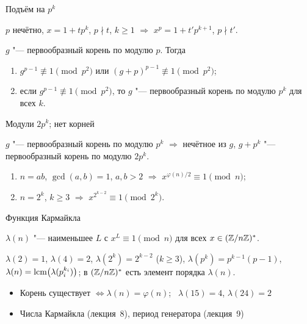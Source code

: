 \documentclass{ca-slides}
\begin{document}
\begin{canvasframe}{Подъём на $p^k$}
  \small
  \begin{lemma}
    $p$ нечётно, $x = 1 + tp^k$, $p \nmid t$, $k \ge 1$ $\Rightarrow$ $x^p = 1 + t'p^{k+1}$,
    $p \nmid t'$.
  \end{lemma}
  \begin{theorem}
    $g$ "--- первообразный корень по модулю $p$. Тогда
    \begin{enumerate}
      \item $g^{p-1} \not\equiv 1 \pmod{p^2}$ или $(g + p)^{p-1} \not\equiv 1 \pmod{p^2}$;
      \item если $g^{p-1} \not\equiv 1 \pmod{p^2}$, то $g$ "--- первообразный корень по
        модулю $p^k$ для всех $k$.
    \end{enumerate}
  \end{theorem}
\end{canvasframe}

\begin{canvasframe}{Модули $2p^k$; нет корней}
  \small
  \begin{proposition}
    $g$ "--- первообразный корень по модулю $p^k$ $\Rightarrow$ нечётное из $g$, $g + p^k$ "---
    первообразный корень по модулю $2p^k$.
  \end{proposition}
  \begin{lemma}
    \begin{enumerate}
      \item $n = ab$, $\gcd(a, b) = 1$, $a, b > 2$ $\Rightarrow$ $x^{\varphi(n)/2} \equiv 1 \pmod n$;
      \item $n = 2^k$, $k \ge 3$ $\Rightarrow$ $x^{2^{k-2}} \equiv 1 \pmod{2^k}$.
    \end{enumerate}
  \end{lemma}
\end{canvasframe}

\begin{canvasframe}{Функция Кармайкла}
  \small
  \begin{definition}
    $\lambda(n)$ "--- наименьшее $L$ с $x^L \equiv 1 \pmod n$ для всех $x \in (\mathbb{Z}/n\mathbb{Z})^{*}$.
  \end{definition}
  \begin{theorem}
    $\lambda(2) = 1$, $\lambda(4) = 2$, $\lambda(2^k) = 2^{k-2}$ ($k \ge 3$),
    $\lambda(p^k) = p^{k-1}(p - 1)$,\quad
    $\lambda(n) = \operatorname{lcm}\bigl(\lambda(p_i^{k_i})\bigr)$;
    в $(\mathbb{Z}/n\mathbb{Z})^{*}$ есть элемент порядка $\lambda(n)$.
  \end{theorem}
  \begin{itemize}
    \item Корень существует $\iff \lambda(n) = \varphi(n)$; \ $\lambda(15) = 4$, $\lambda(24) = 2$
    \item Числа Кармайкла (лекция~8), период генератора (лекция~9)
  \end{itemize}
\end{canvasframe}
\end{document}
